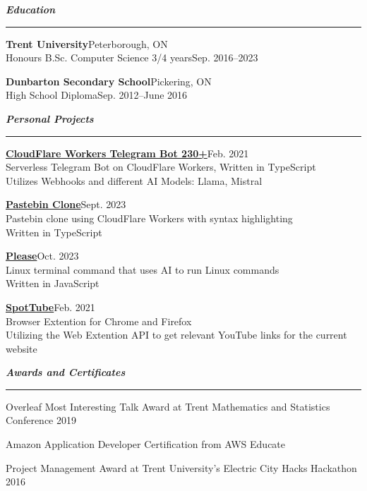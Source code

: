 \documentclass[letterpaper,11pt]{article}
\newcommand{\mysection}[1]{\vspace{5pt} {\bfseries \textsl{#1}} \\ {\color{gray} \rule[5pt]{\textwidth}{1pt}}}
\begin{document}
\mysection{Education}
\begin{description}
    \item \textbf{Trent University}\hfill Peterborough, ON\\
        Honours B.Sc. Computer Science 3/4 years\hfill Sep. 2016–2023
    \item \textbf{Dunbarton Secondary School}\hfill Pickering, ON\\
        High School Diploma\hfill Sep. 2012–June 2016
\end{description}

\mysection{Personal Projects}
\begin{description}
    \item
         \href{https://github.com/codebam/cf-workers-telegram-bot}{\textbf{CloudFlare Workers Telegram Bot  230+}}\hfill Feb. 2021\\
        Serverless Telegram Bot on CloudFlare Workers, Written in TypeScript\\
        Utilizes Webhooks and different AI Models: Llama, Mistral\\
    \item {} \href{https://github.com/codebam/pastebin-r2}{\textbf{Pastebin Clone}}\hfill Sept. 2023\\
        Pastebin clone using CloudFlare Workers with syntax highlighting\\
        Written in TypeScript\\
    \item {} \href{https://github.com/codebam/please}{\textbf{Please}}\hfill Oct. 2023\\
        Linux terminal command that uses AI to run Linux commands\\
        Written in JavaScript\\
    \item {} \href{https://github.com/codebam/spottube}{\textbf{SpotTube}}\hfill Feb. 2021\\
        Browser Extention for Chrome and Firefox\\
        Utilizing the Web Extention API to get relevant YouTube links for the current website\\
\end{description}

\mysection{Awards and Certificates}
\begin{description}
    \item {} Overleaf Most Interesting Talk Award at Trent Mathematics and Statistics Conference 2019
    \item {} Amazon Application Developer Certification from AWS Educate
    \item {} Project Management Award at Trent University's Electric City Hacks Hackathon 2016
\end{description}
\end{document}
